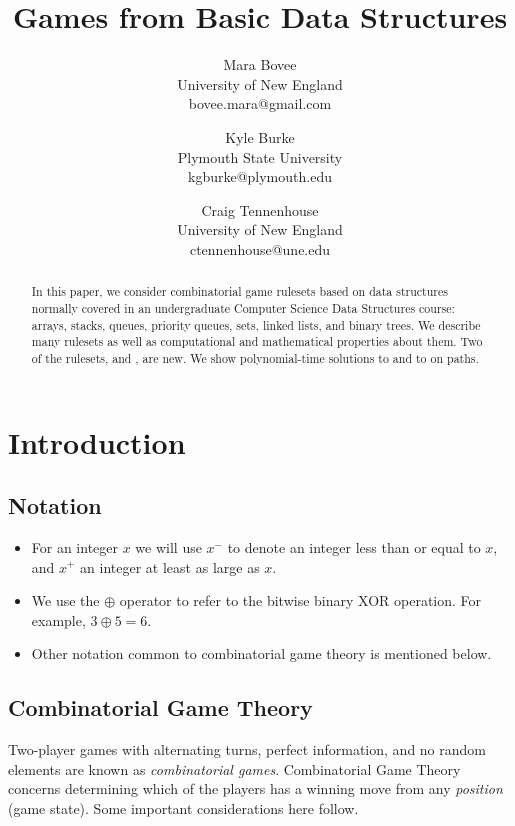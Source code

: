 \documentclass[letter,10pt]{article}
\title{Games from Basic Data Structures}
\author{Mara Bovee \\University of New England\\bovee.mara@gmail.com \and Kyle Burke\\Plymouth State University\\ kgburke@plymouth.edu \and Craig Tennenhouse\\University of New England\\ctennenhouse@une.edu}
\begin{document}
\maketitle

\begin{abstract}
  In this paper, we consider combinatorial game rulesets based on data structures normally covered in an undergraduate Computer Science Data Structures course: arrays, stacks, queues, priority queues, sets, linked lists, and binary trees.  We describe many rulesets as well as computational and mathematical properties about them.  Two of the rulesets,  and , are new.  We show polynomial-time solutions to  and to  on paths.
\end{abstract}

\section{Introduction}

\subsection{Notation}

\begin{itemize}
    \item For an integer $x$ we will use $x^-$ to denote an integer less than or equal to $x$, and $x^+$ an integer at least as large as $x$.

    \item We use the $\oplus$ operator to refer to the bitwise binary XOR operation.  For example, $3 \oplus 5 = 6$.

    \item Other notation common to combinatorial game theory is mentioned below.
\end{itemize}

\subsection{Combinatorial Game Theory}

Two-player games with alternating turns, perfect information, and no random elements are known as \emph{combinatorial games}.  Combinatorial Game Theory concerns determining which of the players has a winning move from any \emph{position} (game state).  Some important considerations here follow.
\end{document}
